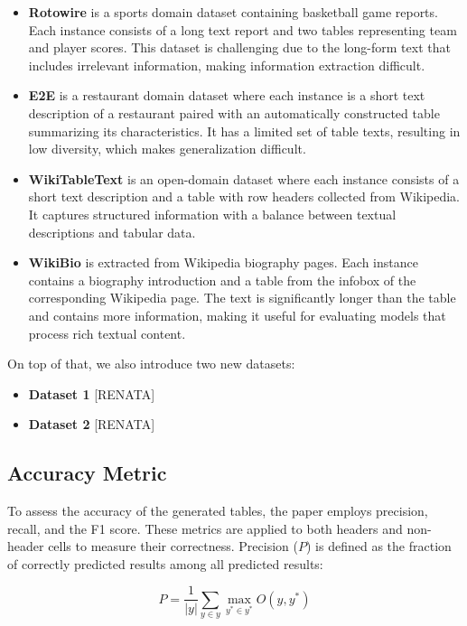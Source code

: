 \documentclass[12pt,a4paper]{article}
\begin{document}
\begin{itemize}

\item{\textbf{Rotowire}} is a sports domain dataset containing basketball game reports. Each instance consists of a long text report and two tables representing team and player scores. This dataset is challenging due to the long-form text that includes irrelevant information, making information extraction difficult.

\item{\textbf{E2E}} is a restaurant domain dataset where each instance is a short text description of a restaurant paired with an automatically constructed table summarizing its characteristics. It has a limited set of table texts, resulting in low diversity, which makes generalization difficult.

\item{\textbf{WikiTableText}} is an open-domain dataset where each instance consists of a short text description and a table with row headers collected from Wikipedia. It captures structured information with a balance between textual descriptions and tabular data.

\item{\textbf{WikiBio}} is extracted from Wikipedia biography pages. Each instance contains a biography introduction and a table from the infobox of the corresponding Wikipedia page. The text is significantly longer than the table and contains more information, making it useful for evaluating models that process rich textual content.
\end{itemize}
On top of that, we also introduce two new datasets:
\begin{itemize}
\item{\textbf{Dataset 1}} [RENATA]
\item{\textbf{Dataset 2}} [RENATA]
\end{itemize}

\subsection*{Accuracy Metric}

To assess the accuracy of the generated tables, the paper employs precision, recall, and the F1 score. These metrics are applied to both headers and non-header cells to measure their correctness. Precision (\( P \)) is defined as the fraction of correctly predicted results among all predicted results:

\[
P = \frac{1}{|y|} \sum_{y \in y} \max_{y^* \in y^*} O(y, y^*)
\]
\end{document}
